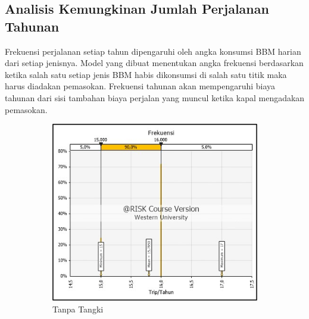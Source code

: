 \subsection{Analisis Kemungkinan Jumlah Perjalanan Tahunan}
\label{subsec:annual-freq-dist}

Frekuensi perjalanan setiap tahun dipengaruhi oleh angka konsumsi BBM harian dari setiap jenisnya. Model yang dibuat menentukan angka frekuensi berdasarkan ketika salah satu setiap jenis BBM habis dikonsumsi di salah satu titik maka harus diadakan pemasokan. Frekuensi tahunan akan mempengaruhi biaya tahunan dari sisi tambahan biaya perjalan yang muncul ketika kapal mengadakan pemasokan.

\begin{figure}[!ht]
    \centering
    \begin{subfigure}{0.4\textwidth}
        \centering
        \includegraphics[width=\textwidth]{grafik/frekuensi-baru.jpg}
        \caption{Tanpa Tangki}
    \end{subfigure}
    \hspace{0.04\textwidth}  %
    \begin{subfigure}{0.4\textwidth}
        \centering

\end{subfigure}
\end{figure}
